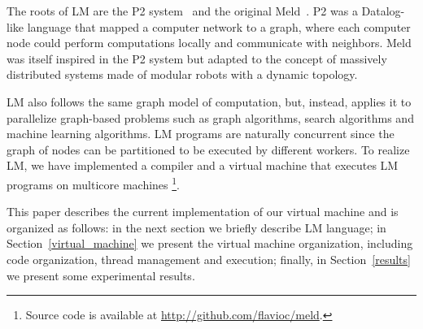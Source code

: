 The roots of LM are the P2 system~\cite{Loo-condie-garofalakis-p2} and the original Meld~\cite{ashley-rollman-derosa-iros07wksp,ashley-rollman-iclp09}.
P2 was a Datalog-like language that mapped a computer network
to a graph, where each computer node could perform computations locally and communicate with neighbors.
Meld was itself inspired in the P2 system but adapted to the concept of massively distributed systems
made of modular robots with a dynamic topology.

LM also follows the same graph model of computation, but, instead, applies it to parallelize graph-based problems such as
graph algorithms, search algorithms and machine learning algorithms. LM programs are naturally concurrent since the graph of nodes
can be partitioned to be executed by different workers.
To realize LM, we have implemented a compiler and a virtual machine that executes LM programs on multicore machines
\footnote{Source code is available at \url{http://github.com/flavioc/meld}.}.

This paper describes the current implementation of
our virtual machine and is organized as follows: in the next section we
briefly describe LM language; in Section~\ref{virtual_machine} we present the virtual machine organization, including code organization, thread management and
execution; finally, in Section~\ref{results} we present some experimental results.